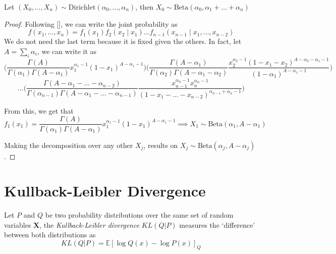 \begin{proposition}\label{prop:dirichlet_marginal}
  Let
  \((X_{0},\dots, X_{n}) \sim \text{Dirichlet}(\alpha_{0}, \dots, \alpha_{n})\),
  then \(X_{0} \sim \text{Beta}(\alpha_{0}, \alpha_{1}+\dots+\alpha_{n})\)
\end{proposition}
\begin{proof}
  Following [\cite{farrow}], we can write the joint probability as
  \[
    f(x_{1},\dots,x_{n}) = f_{1}(x_{1})f_{2}(x_{2}\mid x_{1})\dots f_{n-1}(x_{n-1}\mid x_{1},\dots, x_{n-2})
  \]
  We do not need the last term because it is fixed given the others. In fact, let \(A = \sum_{i} \alpha_{i}\), we can write it as
  \[
   \Bigg( \frac{\Gamma(A)}{\Gamma(\alpha_{1}) \Gamma(A - \alpha_{1})}x_{1}^{\alpha_{1}-1}(1 - x_{1})^{A - \alpha_{1} -1}\Bigg)\Bigg( \frac{\Gamma(A - \alpha_{1})}{\Gamma(\alpha_{2}) \Gamma(A - \alpha_{1} - \alpha_{2})}\frac{ x_{2}^{\alpha_{2}-1}(1-x_{1}- x_{2})^{A - \alpha_{2}- \alpha_{1} - 1} }{(1-\alpha_{1})^{A - \alpha_{1} - 1} }\Bigg )
 \]
 \[
   \dots \Big(\frac{\Gamma(A - \alpha_{1} - \dots - \alpha_{n-2})}{\Gamma(\alpha_{n-1}) \Gamma(A - \alpha_{1}- \dots - \alpha_{n-1})}  \frac{ x_{n-1}^{\alpha_{n}-1} x_{n}^{\alpha_{n}-1}}{(1-x_{1}- \dots - x_{n-2})^{\alpha_{n-1}+\alpha_{n}-1}}\Big)
 \]

 From this, we get that
 \[
   f_{1}(x_{1}) =  \frac{\Gamma(A)}{\Gamma(\alpha_{1}) \Gamma(A - \alpha_{1})}x_{1}^{\alpha_{1}-1}(1 - x_{1})^{A - \alpha_{1} -1} \implies X_{1} \sim \text{Beta}(\alpha_{1}, A- \alpha_{1})
 \]

 Making the decomposition over any other \(X_{j}\), results on
 \(X_{j} \sim \text{Beta}(\alpha_{j}, A - \alpha_{j})\).


\end{proof}



\section{Kullback-Leibler Divergence}

\begin{definition}
  Let \(P\) and \(Q\) be two probability distributions over the same set of
  random variables \(\bm{X}\), the \emph{Kullback-Leibler divergence}
  \(KL(Q|P)\) measures the `difference' between both distributions as
  \[
    KL(Q|P) = \mathbb{E}[\log Q(x) - \log P(x)]_Q
  \]
\end{definition}

